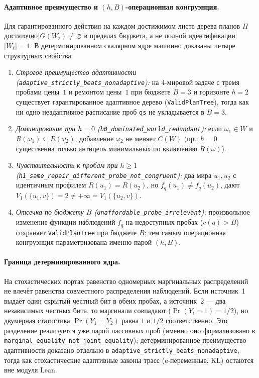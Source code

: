 \documentclass[11pt,a4paper]{article}
\theoremstyle{preprintthm}
\theoremstyle{preprintdef}
\begin{document}
\paragraph{Адаптивное преимущество и $(h,B)$-операционная конгруэнция.}
Для гарантированного действия на каждом достижимом листе дерева планов $\Pi$ достаточно $G(W_\ell)\ne\varnothing$ в пределах бюджета, а не полной идентификации $|W_\ell|=1$. В детерминированном скалярном ядре машинно доказаны четыре структурных свойства:
\begin{enumerate}
  \item \emph{Строгое преимущество адаптивности (\texttt{adaptive\_\allowbreak strictly\_\allowbreak beats\_\allowbreak nonadaptive}):} на 4-мировой задаче с тремя пробами цены~$1$ и ремонтом цены~$1$ при бюджете $B=3$ и горизонте $h=2$ существует гарантированное адаптивное дерево (\texttt{ValidPlanTree}), тогда как ни одно неадаптивное расписание проб \texttt{qs} не укладывается в $B=3$.
  \item \emph{Доминирование при $h=0$ (\texttt{h0\_dominated\_world\_redundant}):} если $\omega_1\in W$ и $R(\omega_1)\subseteq R(\omega_2)$, добавление $\omega_2$ не меняет $C(W)$ (при $h=0$ существенна только антицепь минимальных по включению $R(\omega)$).
  \item \emph{Чувствительность к пробам при $h\ge 1$ (\texttt{h1\_\allowbreak same\_\allowbreak repair\_\allowbreak different\_\allowbreak probe\_\allowbreak not\_\allowbreak congruent}):} два мира $u_1,u_2$ с идентичным профилем $R(u_1)=R(u_2)$, но $f_q(u_1)\ne f_q(u_2)$, дают $V_1(\{u_1,v\})=2\ne +\infty = V_1(\{u_2,v\})$.
  \item \emph{Отсечка по бюджету $B$ (\texttt{unaffordable\_probe\_irrelevant}):} произвольное изменение функции наблюдений $f_q$ на недоступных пробах ($c(q)>B$) сохраняет \texttt{ValidPlanTree} при бюджете $B$; тем самым операционная конгруэнция параметризована именно парой $(h,B)$.
\end{enumerate}

\paragraph{Граница детерминированного ядра.}
На стохастических портах равенство одномерных маргинальных распределений не влечёт равенства совместного распределения наблюдений. Если источник~1 выдаёт один скрытый честный бит в обеих пробах, а источник~2 --- два независимых честных бита, то маргинали совпадают ($\Pr(Y_t=1)=1/2$), но двумерная статистика $\Pr(Y_1=Y_2)$ равна $1$ и $1/2$ соответственно. Это разделение реализуется уже парой пассивных проб (именно оно формализовано в \texttt{marginal\_\allowbreak equality\_\allowbreak not\_\allowbreak joint\_\allowbreak equality}); детерминированное преимущество адаптивности доказано отдельно в \texttt{adaptive\_\allowbreak strictly\_\allowbreak beats\_\allowbreak nonadaptive}, тогда как стохастические адаптивные законы трасс (e-переменные, KL) остаются вне модуля Lean.
\end{document}
